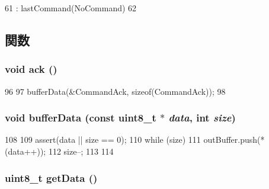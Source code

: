 \begin{DoxyCode}
61                 : lastCommand(NoCommand)
62     {}
\end{DoxyCode}


\subsection{関数}
\hypertarget{classX86ISA_1_1PS2Device_ad1d30e70693fa0b07c77697ecf181ef1}{
\subsubsection[{ack}]{\setlength{\rightskip}{0pt plus 5cm}void ack ()}}
\label{classX86ISA_1_1PS2Device_ad1d30e70693fa0b07c77697ecf181ef1}



\begin{DoxyCode}
96 {
97     bufferData(&CommandAck, sizeof(CommandAck));
98 }
\end{DoxyCode}
\hypertarget{classX86ISA_1_1PS2Device_ae2ad55fbaa638568a74bdd631bcc0757}{
\subsubsection[{bufferData}]{\setlength{\rightskip}{0pt plus 5cm}void bufferData (const uint8\_\-t $\ast$ {\em data}, \/  int {\em size})}}
\label{classX86ISA_1_1PS2Device_ae2ad55fbaa638568a74bdd631bcc0757}



\begin{DoxyCode}
108 {
109     assert(data || size == 0);
110     while (size) {
111         outBuffer.push(*(data++));
112         size--;
113     }
114 }
\end{DoxyCode}
\hypertarget{classX86ISA_1_1PS2Device_abe40c1e97e22c2185a0cce90fe4c04a7}{
\subsubsection[{getData}]{\setlength{\rightskip}{0pt plus 5cm}uint8\_\-t getData ()}}
\label{classX86ISA_1_1PS2Device_abe40c1e97e22c2185a0cce90fe4c04a7}



